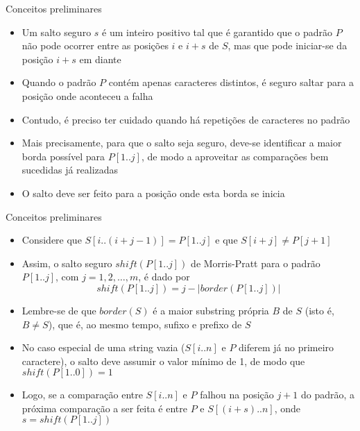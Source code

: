 \begin{frame}[fragile]{Conceitos preliminares}

    \begin{itemize}
        \item Um salto seguro $s$ é um inteiro positivo tal que é garantido que o padrão $P$
            não pode ocorrer entre as posições $i$ e $i + s$ de $S$, mas que pode iniciar-se 
            da posição $i+s$ em diante

        \item Quando o padrão $P$ contém apenas caracteres distintos, é seguro saltar para a 
            posição onde aconteceu a falha

        \item Contudo, é preciso ter cuidado quando há repetições de caracteres no padrão

        \item Mais precisamente, para que o salto seja seguro, deve-se identificar a maior borda 
            possível para $P[1..j]$, de modo a aproveitar as comparações bem sucedidas já
            realizadas

        \item O salto deve ser feito para a posição onde esta borda se inicia

    \end{itemize}

\end{frame}

\begin{frame}[fragile]{Conceitos preliminares}

    \begin{itemize}
        \item Considere que $S[i..(i + j - 1)] = P[1..j]$ e que $S[i + j] \neq P[j + 1]$

        \item Assim, o salto seguro $shift(P[1..j])$ de Morris-Pratt para o padrão 
        $P[1..j]$, com $j = 1, 2, \ldots, m$, é dado por
        \[
            shift(P[1..j]) = j - |border(P[1..j])|
        \]

        \item Lembre-se de que $border(S)$ é a maior substring própria $B$ de $S$ (isto é,
            $B\neq S$), que é, ao mesmo tempo, sufixo e prefixo de $S$

        \item No caso especial de uma string vazia ($S[i..n]$ e $P$ diferem já no primeiro
            caractere), o salto deve assumir o valor mínimo de 1, de 
            modo que $shift(P[1..0]) = 1$

        \item Logo, se a comparação entre $S[i..n]$ e $P$ falhou na posição $j + 1$ do padrão,
            a próxima comparação a ser feita é entre $P$ e $S[(i + s)..n]$, onde
            $s = shift(P[1..j])$
    \end{itemize}

\end{frame}

